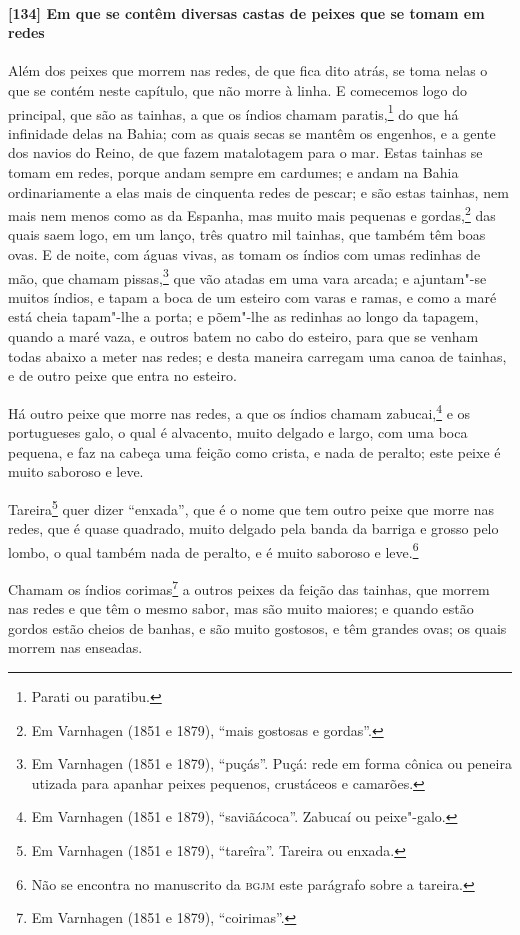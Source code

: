 \paragraph{[134] Em que se contêm diversas castas de peixes que se tomam em redes}\quad
Além dos peixes que morrem nas redes, de que fica dito atrás, se toma nelas o que se
contém neste capítulo, que não morre à linha. E comecemos logo do principal, que são as
tainhas, a que os índios chamam paratis,\footnote{ Parati ou paratibu.} do que há
infinidade delas na Bahia; com as quais secas se mantêm os engenhos, e a gente dos navios
do Reino, de que fazem matalotagem para o mar. Estas tainhas se tomam em redes, porque
andam sempre em cardumes; e andam na Bahia ordinariamente a elas mais de cinquenta redes
de pescar; e são estas tainhas, nem mais nem menos como as da Espanha, mas muito mais
pequenas e gordas,\footnote{ Em Varnhagen (1851 e 1879), ``mais gostosas e gordas''.} das
quais saem logo, em um lanço, três quatro mil tainhas, que também têm boas ovas. E de
noite, com águas vivas, as tomam os índios com umas redinhas de mão, que chamam
pissas,\footnote{ Em Varnhagen (1851 e 1879), ``puçás''. Puçá: rede em forma cônica ou
peneira utizada para apanhar peixes pequenos, crustáceos e camarões.} que vão atadas em
uma vara arcada; e ajuntam"-se muitos índios, e tapam a boca de um esteiro com varas e
ramas, e como a maré está cheia tapam"-lhe a porta; e põem"-lhe as redinhas ao longo da
tapagem, quando a maré vaza, e outros batem no cabo do esteiro, para que se venham todas
abaixo a meter nas redes; e desta maneira carregam uma canoa de tainhas, e de outro peixe
que entra no esteiro.

Há outro peixe que morre nas redes, a que os índios chamam zabucai,\footnote{ Em Varnhagen
(1851 e 1879), ``saviãácoca''. Zabucaí ou peixe"-galo.} e os portugueses galo, o qual é
alvacento, muito delgado e largo, com uma boca pequena, e faz na cabeça uma feição como
crista, e nada de peralto; este peixe é muito saboroso e leve.

Tareira\footnote{ Em Varnhagen (1851 e 1879), ``tareîra''. Tareira ou enxada.} quer dizer
``enxada'', que é o nome que tem outro peixe que morre nas redes, que é quase quadrado,
muito delgado pela banda da barriga e grosso pelo lombo, o qual também nada de peralto, e
é muito saboroso e leve.\footnote{ Não se encontra no manuscrito da \textsc{bgjm} este
parágrafo sobre a tareira.}

Chamam os índios corimas\footnote{ Em Varnhagen (1851 e 1879), ``coirimas''.} a outros
peixes da feição das tainhas, que morrem nas redes e que têm o mesmo sabor, mas são muito
maiores; e quando estão gordos estão cheios de banhas, e são muito gostosos, e têm grandes
ovas; os quais morrem nas enseadas.


